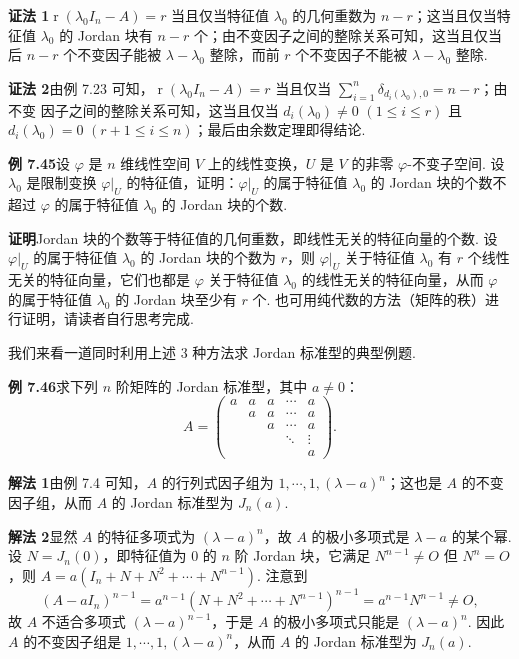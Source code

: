 \documentclass[UTF8, 12pt, fontset=fandol, oneside]{ctexart}
\begin{document}
\noindent\textbf{证法 1}\quad $\operatorname{r}(\lambda_0I_n-A)=r$ 当且仅当特征值 $\lambda_0$ 的几何重数为 $n-r$；这当且仅当特征值 $\lambda_0$ 的 Jordan 块有 $n-r$ 个；由不变因子之间的整除关系可知，这当且仅当后 $n-r$ 个不变因子能被 $\lambda-\lambda_0$ 整除，而前 $r$ 个不变因子不能被 $\lambda-\lambda_0$ 整除.

\noindent\textbf{证法 2}\quad 由例 7.23 可知，$\operatorname{r}(\lambda_0I_n-A)=r$ 当且仅当 $\sum_{i=1}^n\delta_{d_i(\lambda_0),0}=n-r$；由不变
因子之间的整除关系可知，这当且仅当 $d_i(\lambda_0)\ne 0$ $(1\le i\le r)$ 且 $d_i(\lambda_0)=0$ $(r+1\le i\le n)$；最后由余数定理即得结论.

\noindent\textbf{例 7.45}\quad 设 $\varphi$ 是 $n$ 维线性空间 $V$ 上的线性变换，$U$ 是 $V$ 的非零 $\varphi$-不变子空间. 设 $\lambda_0$ 是限制变换 $\varphi|_U$ 的特征值，证明：$\varphi|_U$ 的属于特征值 $\lambda_0$ 的 Jordan 块的个数不超过 $\varphi$ 的属于特征值 $\lambda_0$ 的 Jordan 块的个数.

\noindent\textbf{证明}\quad Jordan 块的个数等于特征值的几何重数，即线性无关的特征向量的个数. 设 $\varphi|_U$ 的属于特征值 $\lambda_0$ 的 Jordan 块的个数为 $r$，则 $\varphi|_U$ 关于特征值 $\lambda_0$ 有 $r$ 个线性无关的特征向量，它们也都是 $\varphi$ 关于特征值 $\lambda_0$ 的线性无关的特征向量，从而 $\varphi$ 的属于特征值 $\lambda_0$ 的 Jordan 块至少有 $r$ 个. 也可用纯代数的方法（矩阵的秩）进行证明，请读者自行思考完成.

我们来看一道同时利用上述 3 种方法求 Jordan 标准型的典型例题.

\noindent\textbf{例 7.46}\quad 求下列 $n$ 阶矩阵的 Jordan 标准型，其中 $a\ne 0$：
\[
A=\left(\begin{array}{ccccc}
a & a & a & \cdots & a\\
  & a & a & \cdots & a\\
  &   & a & \cdots & a\\
  &   &   & \ddots & \vdots\\
  &   &   &        & a
\end{array}\right).
\]

\noindent\textbf{解法 1}\quad 由例 7.4 可知，$A$ 的行列式因子组为 $1,\cdots,1,(\lambda-a)^n$；这也是 $A$ 的不变因子组，从而 $A$ 的 Jordan 标准型为 $J_n(a)$.

\noindent\textbf{解法 2}\quad 显然 $A$ 的特征多项式为 $(\lambda-a)^n$，故 $A$ 的极小多项式是 $\lambda-a$ 的某个幂. 设 $N=J_n(0)$，即特征值为 $0$ 的 $n$ 阶 Jordan 块，它满足 $N^{n-1}\ne O$ 但 $N^n=O$，则 $A=a(I_n+N+N^2+\cdots+N^{n-1})$. 注意到
\[
(A-aI_n)^{n-1}=a^{n-1}(N+N^2+\cdots+N^{n-1})^{n-1}=a^{n-1}N^{n-1}\ne O,
\]
故 $A$ 不适合多项式 $(\lambda-a)^{n-1}$，于是 $A$ 的极小多项式只能是 $(\lambda-a)^n$. 因此 $A$ 的不变因子组是 $1,\cdots,1,(\lambda-a)^n$，从而 $A$ 的 Jordan 标准型为 $J_n(a)$.
\end{document}
